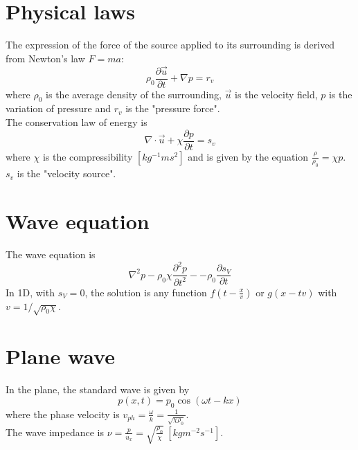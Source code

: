 \documentclass[12pt, openany]{report}
\theoremstyle{definition}
\begin{document}
\section{Physical laws}
The expression of the force of the source applied to its surrounding is derived from Newton's law $F=ma$:
\begin{equation}
  \rho_0 \frac{\partial \vec{u}}{\partial t} + \nabla p = r_v
\end{equation}
where $\rho_0$ is the average density of the surrounding, $\vec{u}$ is the velocity field, $p$ is the variation of pressure and $r_v$ is the "pressure force". \\
The conservation law of energy is 
\begin{equation}
  \nabla \cdot \vec{u} + \chi \frac{\partial p}{\partial t}=s_v
\end{equation}
where $\chi$ is the compressibility $[kg^{-1}ms^2]$ and is given by the equation $\frac{\rho}{\rho_0}=\chi p$. $s_v$ is the "velocity source".\\
\section{Wave equation}
The wave equation is
\begin{equation}
	\nabla^2p-\rho_0\chi \frac{\partial^2 p}{\partial t^2} - -\rho_0 \frac{\partial s_V}{\partial t}
\end{equation}
In 1D, with $s_V=0$, the solution is any function $f\left(t-\frac{x}{v}\right)$ or $g\left(x-tv\right)$ with $v=1/\sqrt{\rho_0\chi}$. 
\section{Plane wave}
In the plane, the standard wave is given by 
\begin{equation}
	p(x,t)=p_0 \cos(\omega t-kx)
\end{equation}
where the phase velocity is $v_{ph} = \frac{\omega}{k}=\frac{1}{\sqrt{\chi \rho_0}}$.\\
The wave impedance is $\nu = \frac{p}{u_x} = \sqrt{\frac{\rho_0}{\chi}} \ [kgm^{-2}s^{-1}]$.
\end{document}

